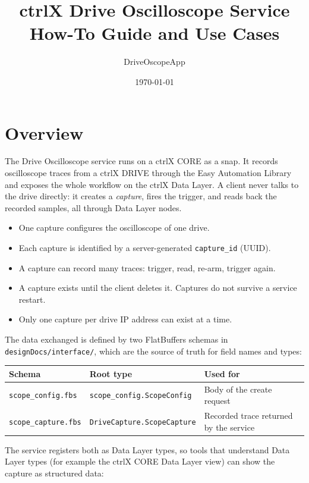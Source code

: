 \documentclass[11pt,a4paper]{article}
\title{ctrlX Drive Oscilloscope Service\\[0.3em]\large How-To Guide and Use Cases}
\author{DriveOscopeApp}
\date{\today}
\newcommand{\dl}[1]{\texttt{#1}}
\begin{document}
\maketitle
\tableofcontents
\newpage

\section{Overview}

The Drive Oscilloscope service runs on a ctrlX CORE as a snap. It records
oscilloscope traces from a ctrlX DRIVE through the Easy Automation Library and
exposes the whole workflow on the ctrlX Data Layer. A client never talks to the
drive directly: it creates a \emph{capture}, fires the trigger, and reads back
the recorded samples, all through Data Layer nodes.

\begin{itemize}[nosep]
  \item One capture configures the oscilloscope of one drive.
  \item Each capture is identified by a server-generated \dl{capture\_id} (UUID).
  \item A capture can record many traces: trigger, read, re-arm, trigger again.
  \item A capture exists until the client deletes it. Captures do not survive a
        service restart.
  \item Only one capture per drive IP address can exist at a time.
\end{itemize}

The data exchanged is defined by two FlatBuffers schemas in
\dl{designDocs/interface/}, which are the source of truth for field names and
types:

\begin{center}
\begin{tabular}{@{}lll@{}}
\toprule
Schema & Root type & Used for \\
\midrule
\dl{scope\_config.fbs}  & \dl{scope\_config.ScopeConfig}  & Body of the create request \\
\dl{scope\_capture.fbs} & \dl{DriveCapture.ScopeCapture} & Recorded trace returned by the service \\
\bottomrule
\end{tabular}
\end{center}

The service registers both as Data Layer types, so tools that understand
Data Layer types (for example the ctrlX CORE Data Layer view) can show the
capture as structured data:
\end{document}
